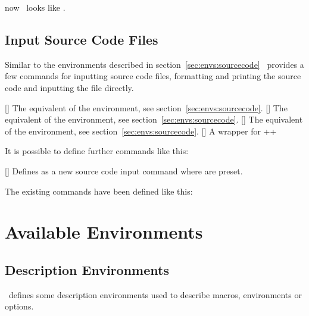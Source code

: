 \documentclass[load-preamble+]{cnltx-doc}
\begin{document}
\begin{example}
  now \foothree\ looks like \cnltx.
\end{example}

\subsection{Input Source Code Files}
Similar to the environments described in section~\vref{sec:envs:sourcecode}
\cnltxexample\ provides a few commands for inputting source code files,
formatting and printing the source code and inputting the file directly.
\begin{commands}
  []
    The equivalent of the  environment, see
    section~\vref{sec:envs:sourcecode}.
  []
    The equivalent of the  environment, see
    section~\vref{sec:envs:sourcecode}.
  []
    The equivalent of the  environment, see
    section~\vref{sec:envs:sourcecode}.
  []
    A wrapper for
    \verbcode++
\end{commands}

It is possible to define further commands like this:
\begin{commands}
  []
    Defines  as a new source code input command where
     are preset.
\end{commands}

The existing commands have been defined like this:
\begin{sourcecode}
  \newinputsourcefilecmd{}
\end{sourcecode}

\section{Available Environments}\label{sec:envs}
\subsection{Description Environments}\label{sec:envs:description}
\cnltxdoc\ defines some description environments used to describe macros,
environments or options.
\end{document}
